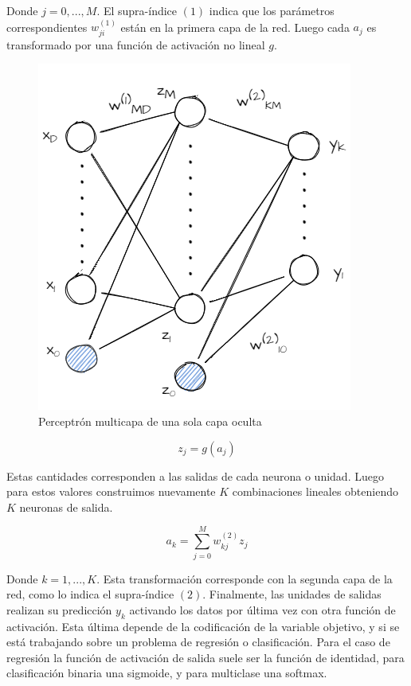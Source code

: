 Donde $j = 0,..., M$. El supra-índice $(1)$ indica que los parámetros
correspondientes $w_{ji}^{(1)}$ están en la primera capa de la red. Luego cada
$a_j$ es transformado por una función de activación no lineal $g$.

\begin{figure}
    \centering
    \includegraphics[scale=0.5]{figures/multilayer_perceptron.png}
    \caption{Perceptrón multicapa de una sola capa oculta}
    \label{fig:nn_multilayer_perceptron}
\end{figure}

\begin{equation}
    z_j = g(a_j)
\end{equation}

Estas cantidades corresponden a las salidas de cada neurona o unidad. Luego para
estos valores construimos nuevamente $K$ combinaciones lineales obteniendo $K$
neuronas de salida.

\begin{equation}
    a_k = \sum_{j=0}^{M} w_{kj}^{(2)}z_j
\end{equation}

Donde $k= 1,..., K$. Esta transformación corresponde con la segunda capa de la
red, como lo indica el supra-índice $(2)$. Finalmente, las unidades de salidas
realizan su predicción $y_k$ activando los datos por última vez con otra función
de activación. Esta última depende de la codificación de la variable objetivo, y
si se está trabajando sobre un problema de regresión o clasificación. Para el
caso de regresión la función de activación de salida suele ser la función de
identidad, para clasificación binaria una sigmoide, y para multiclase una
softmax.

